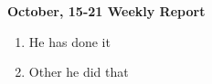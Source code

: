 \documentclass[a4paper,12pt]{article}
\begin{document}
\begin{center}
	\Large\textbf{October, 15-21 Weekly Report}
\end{center}

\begin{enumerate}
	\item He has done it
	\item Other he did that
	
\end{enumerate}
\lipsum[1-5]
\end{document}
